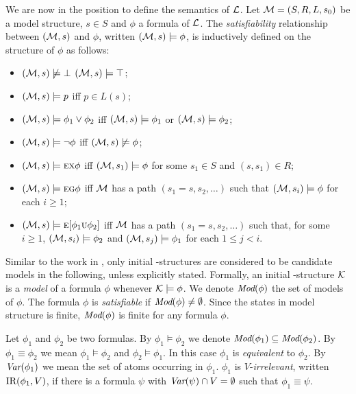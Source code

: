\documentclass{article}
\begin{document}
We are now in the position to define the semantics of $\cal L$.
Let ${\cal M}=(S,R,L,s_0)$ be a model structure, $s\in S$ and $\phi$ a formula of $\cal L$.
The {\em satisfiability} relationship between $({\cal M},s)$ and $\phi$,
written $({\cal M},s)\models\phi$, is inductively defined on the structure of $\phi$ as follows:

\begin{itemize}
  \item $({\cal M},s)\not\models\bot$   $({\cal M},s)\models\top$;
  \item $({\cal M},s)\models p$ iff $p\in L(s)$;
  \item $({\cal M},s)\models \phi_1\lor\phi_2$ iff
    $({\cal M},s)\models \phi_1$ or $({\cal M},s)\models \phi_2$;
  \item $({\cal M},s)\models \neg\phi$ iff  $({\cal M},s)\not\models\phi$;
  \item $({\cal M},s)\models \textsc{e}\textsc{x}\phi$ iff
    $({\cal M},s_1)\models\phi$ for some $s_1\in S$ and $(s,s_1)\in R$;
  \item $({\cal M},s)\models \textsc{e}\textsc{g}\phi$ iff
    $\cal M$ has a path $(s_1=s,s_2,\ldots)$ such that
    $({\cal M},s_i)\models\phi$ for each $i\ge 1$;
  \item $({\cal M},s)\models \textsc{e}[\phi_1\textsc{u}\phi_2]$ iff
    $\cal M$ has a path $(s_1=s,s_2,\ldots)$ such that, for some $i\ge 1$,
    $({\cal M},s_i)\models\phi_2$ and
    $({\cal M},s_j)\models\phi_1$ for each $1\leq j<i$.
\end{itemize}

Similar to the work in \cite{DBLP:journals/tcs/BrowneCG88,Bolotov:1999:JETAI},
only initial \MPK-structures are considered to be candidate models
in the following, unless explicitly stated. Formally,
an initial \MPK-structure $\cal K$ is a {\em model} of a formula $\phi$
whenever ${\cal K}\models\phi$.
We denote $\textit{Mod}(\phi)$ the set of models of $\phi$.
The formula $\phi$  is {\em satisfiable}
if $\textit{Mod}(\phi)\neq\emptyset$.
Since the states in model structure is finite, $\textit{Mod}(\phi)$
is finite for any formula $\phi$.

Let $\phi_1$ and $\phi_2$ be two formulas.
By $\phi_1\models\phi_2$ we denote $\textit{Mod}(\phi_1)\subseteq\textit{Mod}(\phi_2)$.
By $\phi_1\equiv\phi_2$ we mean $\phi_1\models\phi_2$ and $\phi_2\models\phi_1$.
In this case $\phi_1$ is {\em equivalent} to $\phi_2$.
By $\textit{Var}(\phi_1)$ we mean the set of atoms occurring in $\phi_1$.
 $\phi_1$ is $V$-{\em irrelevant}, written $\textrm{IR}(\phi_1,V)$,
if there is a formula $\psi$ with
$\textit{Var}(\psi)\cap V=\emptyset$ such that $\phi_1\equiv\psi$.
\end{document}
